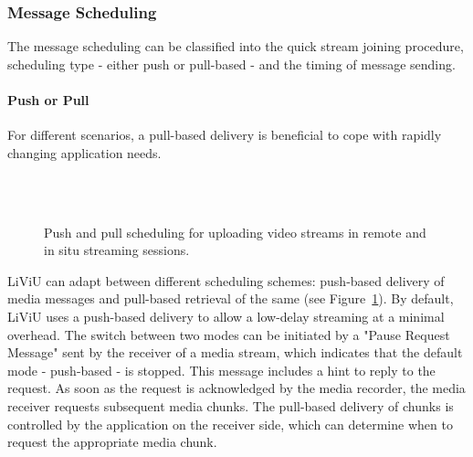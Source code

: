 \subsubsection{Message Scheduling}
\label{sec:522_message_scheduling}
The message scheduling can be classified into the quick stream joining procedure, scheduling type - either push or pull-based - and the timing of message sending. \paragraph{Push or Pull}
For different scenarios, a pull-based delivery is beneficial to cope with rapidly changing application needs.
\begin{figure}[tbh!]
\centering
{}\\
\\
\caption[Overview of different scheduling mechanisms]{Push and pull scheduling for uploading video streams in remote and in situ streaming sessions.}
\label{fig:522_pushpullschemaremote}
\end{figure}
\ac{LiViU} can adapt between different scheduling schemes: push-based delivery of media messages and pull-based retrieval of the same (see Figure~\ref{fig:522_pushpullschemaremote}).
By default, \ac{LiViU} uses a push-based delivery to allow a low-delay streaming at a minimal overhead.
The switch between two modes can be initiated by a "Pause Request Message" sent by the receiver of a media stream, which indicates that the default mode - push-based - is stopped.
This message includes a hint to reply to the request.
As soon as the request is acknowledged by the media recorder, the media receiver requests subsequent media chunks.
The pull-based delivery of chunks is controlled by the application on the receiver side, which can determine when to request the appropriate media chunk.
